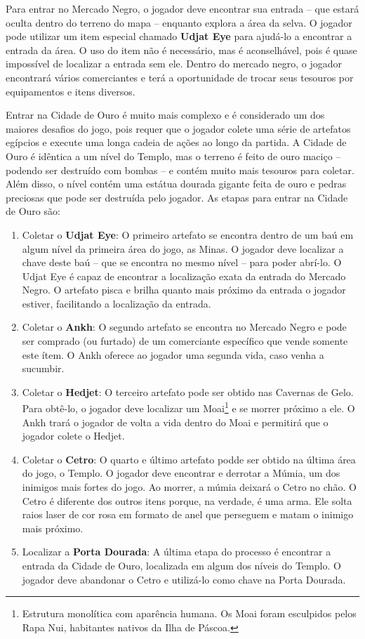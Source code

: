 Para entrar no Mercado Negro, o jogador deve encontrar sua entrada -- que estará
oculta dentro do terreno do mapa -- enquanto explora a área da selva. O jogador
pode utilizar um item especial chamado \textbf{Udjat Eye} para ajudá-lo a
encontrar a entrada da área. O uso do item não é necessário, mas é aconselhável,
pois é quase impossível de localizar a entrada sem ele. Dentro do mercado negro,
o jogador encontrará vários comerciantes e terá a oportunidade de trocar seus
tesouros por equipamentos e itens diversos.

Entrar na Cidade de Ouro é muito mais complexo e é considerado um dos maiores
desafios do jogo, pois requer que o jogador colete uma série de artefatos
egípcios e execute uma longa cadeia de ações ao longo da partida. A Cidade de
Ouro é idêntica a um nível do Templo, mas o terreno é feito de ouro maciço --
podendo ser destruído com bombas -- e contém muito mais tesouros para coletar.
Além disso, o nível contém uma estátua dourada gigante feita de ouro e pedras
preciosas que pode ser destruída pelo jogador. As etapas para entrar na Cidade
de Ouro são:

\begin{enumerate}
	\item Coletar o \textbf{Udjat Eye}: O primeiro artefato se encontra dentro
	de um baú em algum nível da primeira área do jogo, as Minas. O jogador deve
	localizar a chave deste baú -- que se encontra no mesmo nível -- para poder
	abrí-lo. O Udjat Eye é capaz de encontrar a localização exata da entrada do
	Mercado Negro. O artefato pisca e brilha quanto mais próximo da entrada o
	jogador estiver, facilitando a localização da entrada.

	\item Coletar o \textbf{Ankh}: O segundo artefato se encontra no Mercado
	Negro e pode ser comprado (ou furtado) de um comerciante específico que
	vende somente este ítem. O Ankh oferece ao jogador uma segunda vida, caso
	venha a sucumbir.

	\item Coletar o \textbf{Hedjet}: O terceiro artefato pode ser obtido nas
	Cavernas de Gelo. Para obtê-lo, o jogador deve localizar um Moai\footnote{
	Estrutura monolítica com aparência humana. Os Moai foram esculpidos pelos
	Rapa Nui, habitantes nativos da Ilha de Páscoa.} e se morrer próximo a ele.
	O Ankh trará o jogador de volta a vida dentro do Moai e permitirá que o
	jogador colete o Hedjet.

	\item Coletar o \textbf{Cetro}: O quarto e último artefato podde ser obtido
	na última área do jogo, o Templo. O jogador deve encontrar e derrotar a
	Múmia, um dos inimigos mais fortes do jogo. Ao morrer, a múmia deixará o
	Cetro no chão. O Cetro é diferente dos outros itens porque, na verdade, é
	uma arma. Ele solta raios laser de cor rosa em formato de anel que perseguem
	e matam o inimigo mais próximo.

	\item Localizar a \textbf{Porta Dourada}: A última etapa do processo é
	encontrar a entrada da Cidade de Ouro, localizada em algum dos níveis do
	Templo. O jogador deve abandonar o Cetro e utilizá-lo como chave na Porta
	Dourada.
\end{enumerate}

